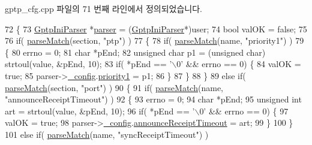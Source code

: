 gptp\+\_\+cfg.\+cpp 파일의 71 번째 라인에서 정의되었습니다.


\begin{DoxyCode}
72 \{
73     \hyperlink{class_gptp_ini_parser}{GptpIniParser} *\hyperlink{namespaceastime__fitline_a90eee7a4677ca8b1ed116364a24367f9}{parser} = (\hyperlink{class_gptp_ini_parser}{GptpIniParser}*)user;
74     \textcolor{keywordtype}{bool} valOK = \textcolor{keyword}{false};
75 
76     \textcolor{keywordflow}{if}( \hyperlink{class_gptp_ini_parser_a8465186d2562a5e0c599175104b214ad}{parseMatch}(section, \textcolor{stringliteral}{"ptp"}) )
77     \{
78         \textcolor{keywordflow}{if}( \hyperlink{class_gptp_ini_parser_a8465186d2562a5e0c599175104b214ad}{parseMatch}(name, \textcolor{stringliteral}{"priority1"}) )
79         \{
80             errno = 0;
81             \textcolor{keywordtype}{char} *pEnd;
82             \textcolor{keywordtype}{unsigned} \textcolor{keywordtype}{char} p1 = (\textcolor{keywordtype}{unsigned} char) strtoul(value, &pEnd, 10);
83             \textcolor{keywordflow}{if}( *pEnd == \textcolor{charliteral}{'\(\backslash\)0'} && errno == 0) \{
84                 valOK = \textcolor{keyword}{true};
85                 parser->\hyperlink{class_gptp_ini_parser_a8733e97ddaee116e34a67d3e222e45c9}{\_config}.\hyperlink{struct_gptp_ini_parser_1_1gptp__cfg__t_aaaa084057ac150d5cfeaff1ccee422b8}{priority1} = p1;
86             \}
87         \}
88     \}
89     \textcolor{keywordflow}{else} \textcolor{keywordflow}{if}( \hyperlink{class_gptp_ini_parser_a8465186d2562a5e0c599175104b214ad}{parseMatch}(section, \textcolor{stringliteral}{"port"}) )
90     \{
91         \textcolor{keywordflow}{if}( \hyperlink{class_gptp_ini_parser_a8465186d2562a5e0c599175104b214ad}{parseMatch}(name, \textcolor{stringliteral}{"announceReceiptTimeout"}) )
92         \{
93             errno = 0;
94             \textcolor{keywordtype}{char} *pEnd;
95             \textcolor{keywordtype}{unsigned} \textcolor{keywordtype}{int} art = strtoul(value, &pEnd, 10);
96             \textcolor{keywordflow}{if}( *pEnd == \textcolor{charliteral}{'\(\backslash\)0'} && errno == 0) \{
97                 valOK = \textcolor{keyword}{true};
98                 parser->\hyperlink{class_gptp_ini_parser_a8733e97ddaee116e34a67d3e222e45c9}{\_config}.\hyperlink{struct_gptp_ini_parser_1_1gptp__cfg__t_a05905c66231ef6fc18d4208c42ce0702}{announceReceiptTimeout} = art;
99             \}
100         \}
101         \textcolor{keywordflow}{else} \textcolor{keywordflow}{if}( \hyperlink{class_gptp_ini_parser_a8465186d2562a5e0c599175104b214ad}{parseMatch}(name, \textcolor{stringliteral}{"syncReceiptTimeout"}) )

\end{DoxyCode}
